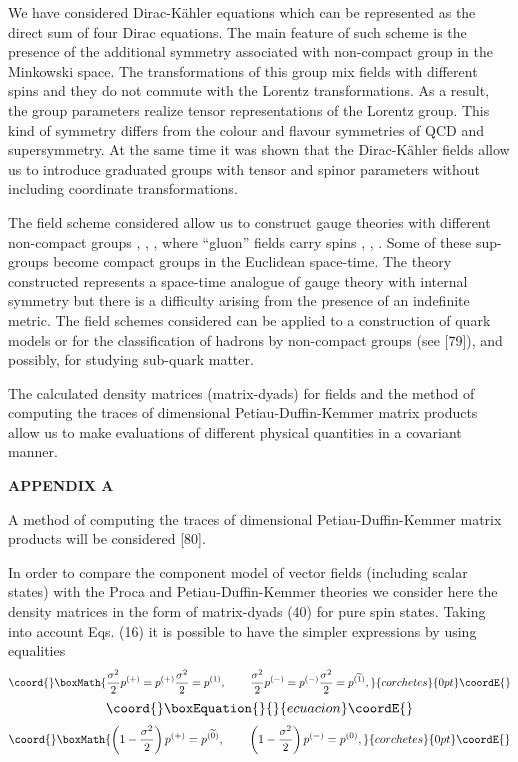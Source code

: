 \documentclass[a4paper,12pt]{article}
\begin{document}
We have considered Dirac-K\"ahler equations which can be represented as the
direct sum of four Dirac equations. The main feature of such scheme is the
presence of the additional symmetry associated with non-compact group in the
Minkowski space. The transformations of this group mix fields with different
spins and they do not commute with the Lorentz transformations. As a result,
the group parameters realize tensor representations of the Lorentz group.
This kind of symmetry differs from the colour and flavour symmetries of QCD
and supersymmetry. At the same time it was shown that the Dirac-K\"ahler
fields allow us to introduce graduated groups with tensor and spinor
parameters without including coordinate transformations.

The field scheme considered allow us to construct gauge theories
with different non-compact groups \coordHE{}, \coordHE{}, \coordHE{},
where ``gluon'' fields carry spins \coordHE{}, \coordHE{}, \coordHE{}. Some of these
sup-groups become compact groups in the Euclidean space-time. The
theory constructed represents a space-time analogue of gauge
theory with internal symmetry but there is a difficulty arising
from the presence of an indefinite metric. The field schemes
considered can be applied to a construction of quark models or for
the classification of hadrons by non-compact groups (see [79]),
and possibly, for studying sub-quark matter.

The calculated density matrices (matrix-dyads) for fields and the method of
computing the traces of \coordHE{}dimensional Petiau-Duffin-Kemmer matrix
products allow us to make evaluations of different physical quantities in a
covariant manner.

\begin{center}
{\bf APPENDIX A}
\end{center}

A method of computing the traces of \coordHE{}dimensional
Petiau-Duffin-Kemmer matrix products will be considered [80].

In order to compare the \coordHE{}component model of vector fields (including
scalar states) with the Proca and Petiau-Duffin-Kemmer theories we consider
here the density matrices in the form of matrix-dyads (40) for pure spin
states. Taking into account Eqs. (16) it is possible to have the simpler
expressions by using equalities
\[\coord{}\boxMath{
\frac{\sigma ^2}2p^{(+)}=p^{(+)}\frac{\sigma ^2}2=p^{(1)} ,
\hspace{0.3in}\frac{ \sigma ^2}2p^{(-)}=p^{(-)}\frac{\sigma
^2}2=p^{(\widetilde{1})} ,
}{corchetes}{0pt}\coordE{}\]
\vspace{-8mm}
\begin{equation}\coord{}\boxEquation{  \label{137}
}{  }{ecuacion}\coordE{}\end{equation}
\vspace{-8mm}
\[\coord{}\boxMath{
 \left( 1-\frac{\sigma ^2}2\right)
p^{(+)}=p^{(\widetilde{0})} ,\hspace{0.3in} \left( 1-\frac{\sigma
^2}2\right) p^{(-)}=p^{(0)} ,
}{corchetes}{0pt}\coordE{}\]
\end{document}
